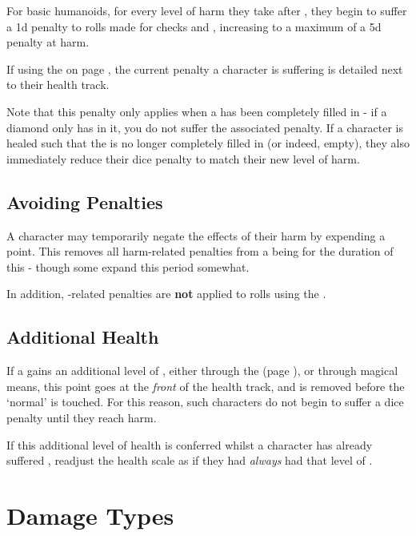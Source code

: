 For basic humanoids, for every level of harm they take after , they begin to suffer a 1d penalty to rolls made for  checks and , increasing to a maximum of a 5d penalty at  harm. 

If using the  on page \pageref{S:CharacterSheet}, the current penalty a character is suffering is detailed next to their health track. 

Note that this penalty only applies when a  has been completely filled in - if a diamond only has  in it, you do not suffer the associated penalty. If a character is healed such that the  is no longer completely filled in (or indeed, empty), they also immediately reduce their dice penalty to match their new level of harm. 

\subsection{Avoiding Penalties}

A character may temporarily negate the effects of their harm by expending a  point. This removes all harm-related penalties from a being for the duration of this  - though some  expand this period somewhat. 

In addition, -related penalties are {\bf not} applied to  rolls using the . 

\subsection{Additional Health}

If a  gains an additional level of , either through the  (page \pageref{S:Progression}), or through magical means, this point goes at the {\it front} of the health track, and is removed before the `normal'  is touched. For this reason, such characters do not begin to suffer a dice penalty until they reach  harm. 

If this additional level of health is conferred whilst a character has already suffered , readjust the health scale  as if they had {\it always} had that level of . 

\section{Damage Types}



